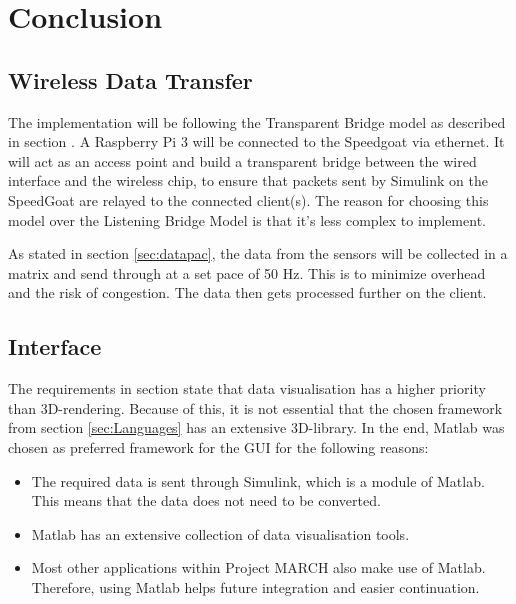 \section{Conclusion}
\subsection{Wireless Data Transfer}
The implementation will be following the Transparent Bridge model as described in section \label{sec:tbm}. A Raspberry Pi 3 will be connected to the Speedgoat via ethernet. It will act as an access point and build a transparent bridge between the wired interface and the wireless chip, to ensure that packets sent by Simulink on the SpeedGoat are relayed to the connected client(s). The reason for choosing this model over the Listening Bridge Model is that it's less complex to implement. 

As stated in section \ref{sec:datapac}, the data from the sensors will be collected in a matrix and send through at a set pace of 50 Hz. This is to minimize overhead and the risk of congestion. The data then gets processed further on the client.
\subsection{Interface}
The requirements in section \label{sec:req} state that data visualisation has a higher priority than 3D-rendering. Because of this, it is not essential that the chosen framework from section \ref{sec:Languages} has an extensive 3D-library. In the end, Matlab was chosen as preferred framework for the GUI for the following reasons:
\begin{itemize}
	\item The required data is sent through Simulink, which is a module of Matlab. This means that the data does not need to be converted.
	\item Matlab has an extensive collection of data visualisation tools.
	\item Most other applications within Project MARCH also make use of Matlab. Therefore, using Matlab helps future integration and easier continuation.
\end{itemize}